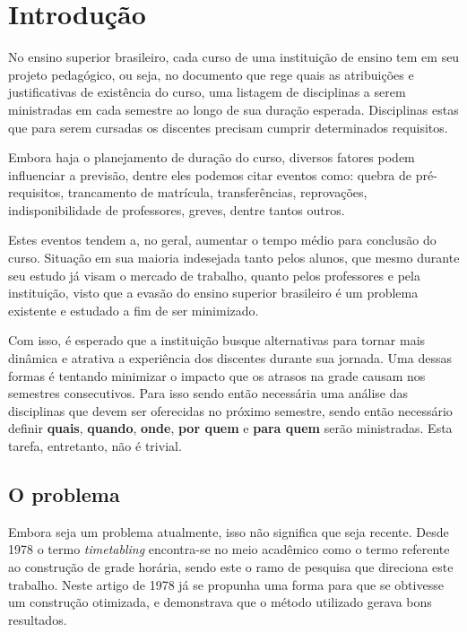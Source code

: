 \chapter{Introdução} \label{chap:introducao}             %

No ensino superior brasileiro, cada curso de uma instituição de ensino tem em seu projeto pedagógico, ou seja, no documento que rege quais as atribuições e justificativas de existência do curso, uma listagem de disciplinas a serem ministradas em cada semestre ao longo de sua duração esperada. Disciplinas estas que para serem cursadas os discentes precisam cumprir determinados requisitos.

Embora haja o planejamento de duração do curso, diversos fatores podem influenciar a previsão, dentre eles podemos citar eventos como: quebra de pré-requisitos, trancamento de matrícula, transferências, reprovações, indisponibilidade de professores, greves, dentre tantos outros.

Estes eventos tendem a, no geral, aumentar o tempo médio para conclusão do curso. Situação em sua maioria indesejada tanto pelos alunos, que mesmo durante seu estudo já visam o mercado de trabalho, quanto pelos professores e pela instituição, visto que a evasão do ensino superior brasileiro é um problema existente e estudado a fim de ser minimizado.

Com isso, é esperado que a instituição busque alternativas para tornar mais dinâmica e atrativa a experiência dos discentes durante sua jornada. Uma dessas formas é tentando minimizar o impacto que os atrasos na grade causam nos semestres consecutivos. Para isso sendo então necessária uma análise das disciplinas que devem ser oferecidas no próximo semestre, sendo então necessário definir \textbf{quais}, \textbf{quando}, \textbf{onde}, \textbf{por quem} e \textbf{para quem} serão ministradas. Esta tarefa, entretanto, não é trivial.

\section{O problema} \label{sec:Problemáticas}        %

Embora seja um problema atualmente, isso não significa que seja recente. Desde 1978 \cite{BARHAM1978} o termo \textit{timetabling} encontra-se no meio acadêmico como o termo referente ao construção de grade horária, sendo este o ramo de pesquisa que direciona este trabalho. Neste artigo de 1978 já se propunha uma forma para que se obtivesse um construção otimizada, e demonstrava que o método utilizado gerava bons resultados.

